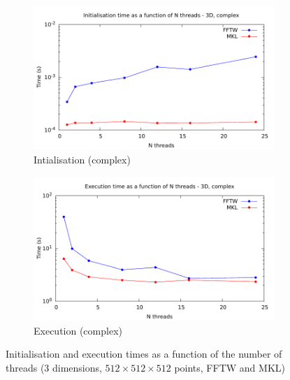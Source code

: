 \documentclass[12pt, a4paper]{article}
\begin{document}
\begin{figure}[H]
\begin{subfigure}{.5\textwidth}
\centering
\includegraphics[width=.9\linewidth]{graphs/3d-multh-init-c.pdf}
\caption{Intialisation (complex)}
\label{3DMULTHCI}
\end{subfigure}%
\begin{subfigure}{.5\textwidth}
\centering
\includegraphics[width=.9\linewidth]{graphs/3d-multh-exec-c.pdf}
\caption{Execution (complex)}
\label{3DMULTHCR}
\end{subfigure}
\caption{Initialisation and execution times as a function of the number of threads (3 dimensions, $512 \times 512\times 512$ points, FFTW and MKL)}
\label{3DMKL}
\end{figure}
\end{document}
